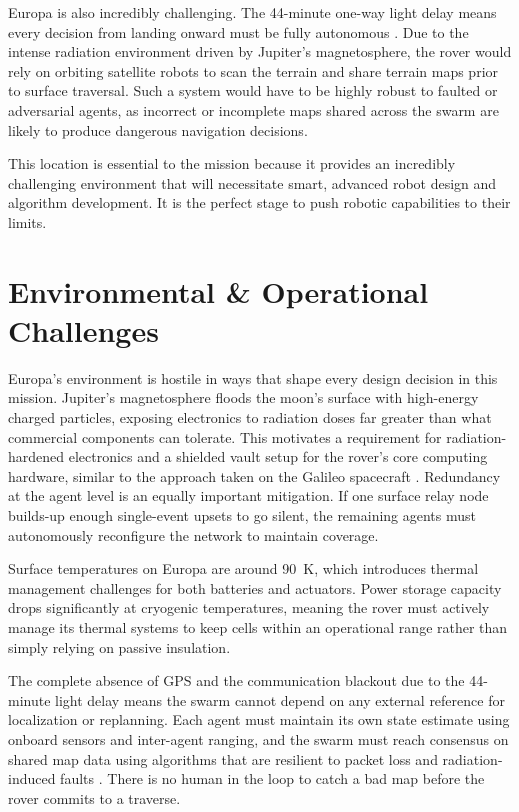 \documentclass[11pt]{article}
\begin{document}
Europa is also incredibly challenging. The 44-minute one-way light delay means every decision from landing onward must
be fully autonomous \cite{nasaSBIR}. Due to the intense radiation environment driven by Jupiter's magnetosphere,
the rover would rely on orbiting satellite robots to scan the terrain and share terrain maps prior to surface traversal.
Such a system would have to be highly robust to faulted or adversarial agents, as incorrect or incomplete maps shared
across the swarm are likely to produce dangerous navigation decisions.

This location is essential to the mission because it provides an incredibly challenging environment that will
necessitate smart, advanced robot design and algorithm development. It is the perfect stage to push robotic
capabilities to their limits.

\section*{Environmental \& Operational Challenges}

Europa's environment is hostile in ways that shape every design decision in this mission.
Jupiter's magnetosphere floods the moon's surface with high-energy charged particles, exposing
electronics to radiation doses far greater than what commercial components can tolerate. This motivates a requirement
for radiation-hardened electronics and a shielded vault setup for the rover's core computing hardware,
similar to the approach taken on the Galileo spacecraft \cite{owlDecadal}. Redundancy at the agent level
is an equally important mitigation. If one surface relay node builds-up enough single-event upsets to
go silent, the remaining agents must autonomously reconfigure the network to maintain coverage.

Surface temperatures on Europa are around 90~K, which introduces thermal management challenges for both
batteries and actuators. Power storage capacity drops significantly at cryogenic temperatures, meaning
the rover must actively manage its thermal systems to keep cells within an operational range rather
than simply relying on passive insulation.

The complete absence of GPS and the communication blackout due to the 44-minute light delay means
the swarm cannot depend on any external reference for localization or replanning. Each agent must
maintain its own state estimate using onboard sensors and inter-agent ranging, and the swarm must
reach consensus on shared map data using algorithms that are resilient to packet loss and
radiation-induced faults \cite{stmdShortfall, nasaSBIR}. There is no human in the loop to catch
a bad map before the rover commits to a traverse.
\end{document}
